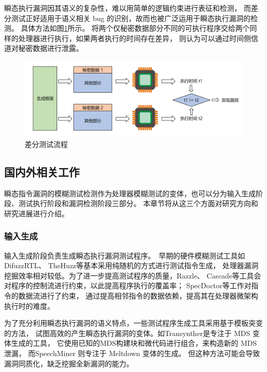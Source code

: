 瞬态执行漏洞因其语义的复杂性，难以用简单的逻辑约束进行表征和检测，
而差分测试正好适用于语义相关 bug 的识别，故而也被广泛运用于瞬态执行漏洞的检测。
具体方法如图\ref{paper:differential-test}所示。
将两个仅秘密数据部分不同的可执行程序交给两个同样的处理器进行执行，如果两者执行的时间存在差异，
则认为可以通过时间侧信道对秘密数据进行泄露。\par

\begin{figure}[!h]
    \centering
    \includegraphics[width=\linewidth]{figure/paper/differential-test.png}
    \caption{差分测试流程}
    \label{paper:differential-test}
\end{figure}

\subsection{国内外相关工作}

瞬态指令漏洞的模糊测试检测作为处理器模糊测试的变体，也可以分为输入生成阶段、测试执行阶段和漏洞检测阶段三部分。
本章节将从这三个方面对研究方向和研究进展进行介绍。

\subsubsection{输入生成}
输入生成阶段负责生成瞬态执行漏洞测试程序。\
早期的硬件模糊测试工具如 DifuzzRTL\cite{hur2021difuzzrtl}、
TheHuzz\cite{kande2022thehuzz}等基本采用纯随机的方式进行测试指令生成，
处理器漏洞挖掘效率相对较低。为了进一步提高测试程序的质量，Razzle\cite{razzle}、
Cascade\cite{soltcascade}等工具会对程序的控制流进行约束，以此提高程序执行的覆盖率；
SpecDoctor\cite{hur2022specdoctor}等工作对指令的数据流进行了约束，
通过提高相邻指令的数据依赖，提高其在处理器微架构执行时的难度。\par

为了充分利用瞬态执行漏洞的语义特点，一些测试程序生成工具采用基于模板突变的方法，
试图高效的产生瞬态执行漏洞的变体。如Transynther\cite{moghimi2020medusa}是专注于 MDS 变体生成的工具，
它使用已知的MDS构建块和微代码进行组合，来构造新的 MDS 泄漏，
而SpeechMiner \cite{xiao2019speechminer}则专注于 Meltdown 变体的生成。
但这种方法可能会导致漏洞同质化，缺乏挖掘全新漏洞的能力。\par

